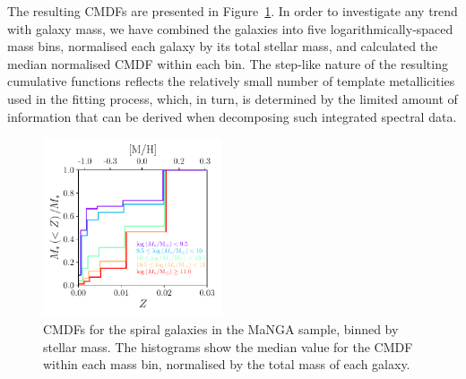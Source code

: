 \documentclass[fleqn,usenatbib]{mnras}
\begin{document}
The resulting CMDFs are presented in Figure~\ref{fig:Median_MDF_total}. In order to investigate any trend with galaxy mass, we have combined the galaxies into five logarithmically-spaced mass bins, normalised each galaxy by its total stellar mass, and calculated the median normalised CMDF within each bin. The step-like nature of the resulting cumulative functions reflects the relatively small number of template metallicities used in the fitting process, which, in turn, is determined by the limited amount of information that can be derived when decomposing such integrated spectral data.

\begin{figure}
	\includegraphics[width=0.47\textwidth]{Figures/Median_MDF_total.pdf}
    \caption{CMDFs for the spiral galaxies in the MaNGA sample, binned by stellar mass. The histograms show the median value for the CMDF within each mass bin, normalised by the total mass of each galaxy.}
    \label{fig:Median_MDF_total}
\end{figure}
\end{document}
